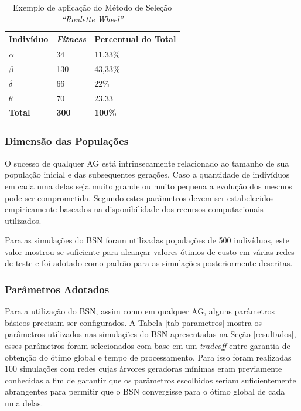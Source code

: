\begin{table}[ht]
\centering
\begin{tabular}{|l|l|l|}
\hline
\multicolumn{1}{|c|}{\textbf{Indivíduo}} & \multicolumn{1}{c|}{\textbf{\emph{Fitness}}} & \textbf{Percentual do Total} \\ \hline
\textbf{$\alpha$} & 34 & 11,33\% \\ \hline
\textbf{$\beta$} & 130 & 43,33\% \\ \hline
\textbf{$\delta$} & 66 & 22\% \\ \hline
\textbf{$\theta$} & 70 & 23,33 \\ \hline
\textbf{Total} & \textbf{300} & \textbf{100\%} \\ \hline
\end{tabular}
\caption[\emph{``Roulette Wheel''}]{Exemplo de aplicação do Método de Seleção \emph{``Roulette Wheel''}}
\label{tab-selecao}
\end{table}

\subsubsection{Dimensão das Populações}
O sucesso de qualquer AG está intrinsecamente relacionado ao tamanho de sua população inicial e das subsequentes gerações. Caso a quantidade de indivíduos em cada uma delas seja muito grande ou muito pequena a evolução dos mesmos pode ser comprometida. Segundo \cite{Goldberg1889} estes parâmetros devem ser estabelecidos empiricamente baseados na disponibilidade dos recursos computacionais utilizados.

Para as simulações do BSN foram utilizadas populações de 500 indivíduos, este valor mostrou-se suficiente para alcançar valores ótimos de custo em várias redes de teste e foi adotado como padrão para as simulações posteriormente descritas.

\subsubsection{Parâmetros Adotados}
\label{parametros}
Para a utilização do BSN, assim como em qualquer AG, alguns parâmetros básicos precisam ser configurados. A Tabela \ref{tab-parametros} mostra os parâmetros utilizados nas simulações do BSN apresentadas na Seção \ref{resultados}, esses parâmetros foram selecionados com base em um \emph{tradeoff} entre garantia de obtenção do ótimo global e tempo de processamento. Para isso foram realizadas 100 simulações com redes cujas árvores geradoras mínimas eram previamente conhecidas a fim de garantir que os parâmetros escolhidos seriam suficientemente abrangentes para permitir que o BSN convergisse para o ótimo global de cada uma delas.

